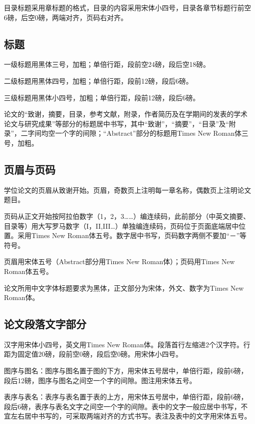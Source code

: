 \documentclass[a4paper,12pt,oneside,openany]{book}
\begin{document}
\begin{CJK}{UTF8}{hei}
目录标题采用章标题的格式，目录的内容采用宋体小四号，目录各章节标题行前空6磅，后空0磅，两端对齐，页码右对齐。


\subsection{标题}

一级标题用黑体三号，加粗；单倍行距，段前空24磅，段后空18磅。

二级标题用黑体四号，加粗；单倍行距，段前12磅，段后6磅。

三级标题用黑体小四号，加粗；单倍行距，段前12磅，段后6磅。

论文的“致谢，摘要，目录，参考文献，附录，作者简历及在学期间的发表的学术论文与研究成果”等部分的标题居中书写，其中“致谢”，“摘要”，“目录”及“附录”，二字间均空一个字的间隙；“Abstract”部分的标题用Times
New Roman体三号，加粗。 


\subsection{页眉与页码}

学位论文的页眉从致谢开始。页眉，奇数页上注明每一章名称，偶数页上注明论文题目。

页码从正文开始按阿拉伯数字（1，2，3……）编连续码，此前部分（中英文摘要、目录等）用大写罗马数字（I，II,III…）单独编连续码，页码位于页面底端居中位置。采用Times
New Roman体五号。数字居中书写，页码数字两侧不要加“－”等符号。

页眉用宋体五号（Abstract部分用Times New Roman体）；页码用Times New Roman体五号。

论文所用中文字体标题要求为黑体，正文部分为宋体，外文、数字为Times New Roman体。 


\subsection{论文段落文字部分}

汉字用宋体小四号，英文用Times New Roman体。段落首行左缩进2个汉字符。行距为固定值20磅，段前空0磅，段后空0磅。用宋体小四号。

图序与图名：图序与图名置于图的下方，用宋体五号居中，单倍行距，段前6磅，段后12磅，图序与图名之间空一个字的间隙。图注用宋体五号。

表序与表名：表序与表名置于表的上方，用宋体五号居中，单倍行距，段前6磅，段后6磅，表序与表名文字之间空一个字的间隙。表中的文字一般应居中书写，不宜左右居中书写的，可采取两端对齐的方式书写。表注及表中的文字用宋体五号。


\end{CJK}
\end{document}
